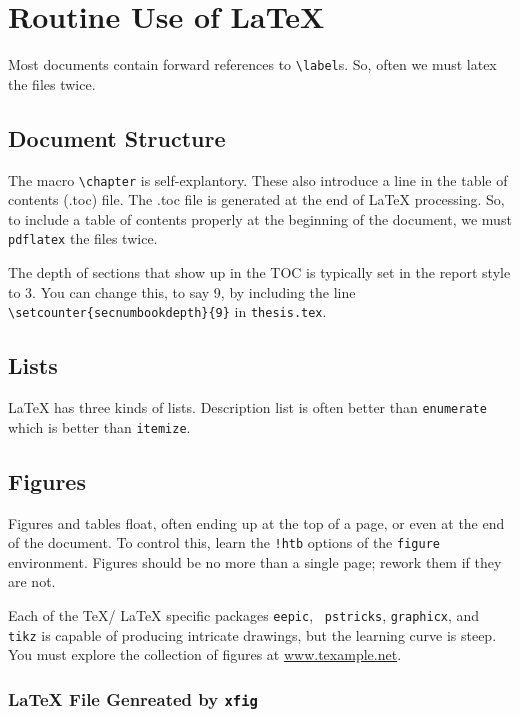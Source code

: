 \chapter{Routine Use of {\LaTeX} }

Most documents contain forward references to \verb|\label|s.  So, often we
must latex the files twice.

\section{Document Structure}

The macro \verb|\chapter| is self-explantory.  These also introduce a
line in the table of contents (.toc) file.  The .toc file is generated
at the end of LaTeX processing.  So, to include a table of contents
properly at the beginning of the document, we must {\tt pdflatex} the
files twice.

The depth of sections that show up in the TOC is typically set in the
report style to 3.  You can change this, to say 9, by including the
line\\ {\tt \verb|\setcounter|\{secnumbookdepth\}\{9\}} in {\tt thesis.tex}.

\section{Lists}

LaTeX has three kinds of lists.  Description list is often better than
{\tt enumerate} which is better than {\tt itemize}.

\section{Figures}

Figures and tables float, often ending up at the top of a page, or
even at the end of the document.  To control this, learn the
\verb|!htb| options of the {\tt figure} environment.  
Figures should be no more than a single page; rework them if
they are not.

Each of the \TeX/ \LaTeX{} specific packages {\tt eepic}, {\tt
  pstricks}, {\tt graphicx}, and {\tt tikz} is capable of producing
intricate drawings, but the learning curve is steep.
You must explore the collection of figures at
\url{www.texample.net}.

\subsection{\LaTeX{} File Genreated by {\tt xfig}}

